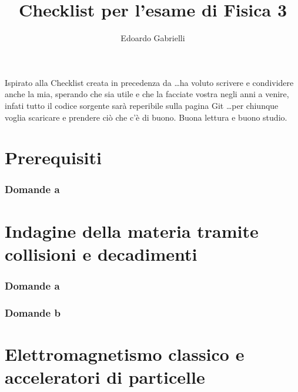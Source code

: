 \documentclass[10pt,a4paper]{article}
\author{Edoardo Gabrielli}
\title{Checklist per l'esame di Fisica 3}
\newcommand{\incfig}[1]{%
    \def\svgwidth{\columnwidth}
    {#1.pdf_tex}
}
\begin{document}
\maketitle
Ispirato alla Checklist creata in precedenza da \ldots ha voluto scrivere e condividere anche la mia, sperando che sia utile e che la facciate vostra negli anni a venire, infati tutto il codice sorgente sarà reperibile sulla pagina Git \ldots per chiunque voglia scaricare e prendere ciò che c'è di buono. Buona lettura e buono studio.



\clearpage

\begin{multicols}{2}
	\tableofcontents
\end{multicols}

\listoffigures
\clearpage


\part{Prerequisiti}
\section{Domande a}


\part{Indagine della materia tramite collisioni e decadimenti}
\setcounter{section}{0}
\renewcommand*{\theHsection}{chX.\the\value{section}}
\section{Domande a}
\section{Domande b}


\part{Elettromagnetismo classico e acceleratori di particelle}
\setcounter{section}{0}
\renewcommand*{\theHsection}{chX.\the\value{section}}
\end{document}

